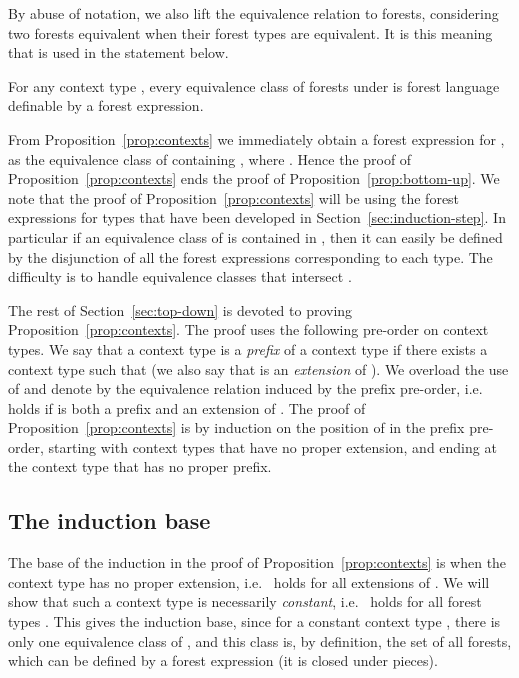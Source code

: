 \documentclass{LMCS}
\begin{document}
By abuse of notation, we also lift the equivalence relation 
to forests, considering two forests  equivalent when their forest
types are equivalent. It is this meaning that is used in the statement
below.
\begin{prop}\label{prop:contexts}
  For any context type , every equivalence class of forests under
   is forest language definable by a  forest
  expression.
\end{prop}

From Proposition~\ref{prop:contexts} we immediately obtain a
 forest expression for , as the equivalence class of
 containing , where .  Hence the proof of
Proposition~\ref{prop:contexts} ends the proof of
Proposition~\ref{prop:bottom-up}.  We note that the proof of
Proposition~\ref{prop:contexts} will be using the  forest
expressions  for types  that have been developed
in Section~\ref{sec:induction-step}. In particular if an equivalence
class of  is contained in , then it can easily
be defined by the disjunction of all the  forest expressions
corresponding to each type. The difficulty is to handle equivalence
classes that intersect .

The rest  of Section~\ref{sec:top-down} is devoted to proving Proposition~\ref{prop:contexts}.
The proof uses the following pre-order on context types. We say that a
context type  is a \emph{prefix} of a context type  if there exists a context type 
such that  (we also say that  is an \emph{extension} of
). We overload the use of
 and denote by  the equivalence relation induced by
the prefix pre-order, i.e.~ holds if  is both a prefix
and an extension of .
The proof of Proposition~\ref{prop:contexts} is by induction on the
position of 
 in the prefix pre-order,  starting with context types that have no
proper extension, and ending at the context type   that has no
proper prefix.

\subsection{ The induction base}
The base of the induction in the proof of Proposition~\ref{prop:contexts} is
when the context type  has no proper extension, i.e.~ holds for
all extensions  of . We will show that such a context type is necessarily
\emph{constant}, i.e.~ holds for all forest types .  This
gives the induction base, since for a constant context type , there is only one
equivalence class of , and this class is, by definition, the set of all
forests, which can be defined by a  forest expression (it is closed under pieces).
\end{document}
